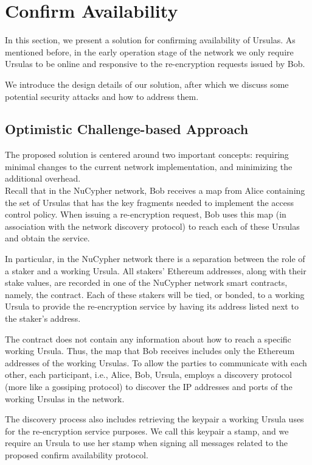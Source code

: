 \section{Confirm Availability}
\label{confirm-availability}
In this section, we present a solution for confirming availability of 
Ursulas. As mentioned before, in the early operation stage of the network we only 
require Ursulas to be online and responsive to the re-encryption 
requests issued by Bob. 


We introduce the design details of our solution, after which we discuss some potential security attacks and how to address them.


\subsection{Optimistic Challenge-based Approach}
The proposed solution is centered around two important concepts: requiring minimal 
changes to the current network implementation, and minimizing the additional overhead. \\


 Recall that in the NuCypher network, Bob receives a map from Alice containing 
the set of Ursulas that has the key fragments needed to implement the access control policy. 
When issuing a re-encryption request, Bob uses this map (in association with the network discovery protocol) to reach each of these Ursulas and obtain 
the service. 


In particular, in the NuCypher network there is a separation between the role of a staker and a working Ursula. All stakers' Ethereum addresses, along with their stake values, are recorded in one of the NuCypher network smart contracts, namely, the \stakeescrow contract. Each of these stakers will be tied, or bonded, to a working Ursula to provide the re-encryption service by having its address listed next to the staker's address. 


The \stakeescrow contract does not contain any information about how to reach a specific working Ursula. Thus, the map that Bob receives includes only the Ethereum addresses of the working Ursulas. To allow the parties to communicate with each other, each participant, i.e., Alice, Bob, Ursula, employs a discovery protocol (more like a gossiping protocol) to discover the IP addresses and ports of the working Ursulas in the network.  


The discovery process also includes retrieving the keypair a working Ursula uses for the re-encryption service purposes. We call this keypair a stamp, and we require an Ursula to use her stamp when signing all messages related to the proposed confirm availability protocol. \\


